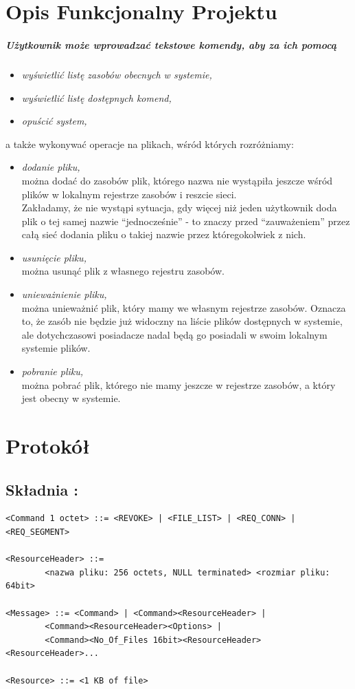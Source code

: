\documentclass[11pt,oneside]{book}
\newcommand{\+}{\discretionary{\mbox{\scriptsize$\hookleftarrow$}}{}{}}
\begin{document}
\chapter{Opis Funkcjonalny Projektu}
\paragraph{Użytkownik może wprowadzać tekstowe komendy, aby za ich pomocą}
\begin{itemize}
\item 
\textsl{wyświetlić listę zasobów obecnych w systemie,}
\item
\textsl{wyświetlić listę dostępnych komend,}
\item
\textsl{opuścić system,}
\end{itemize}
a także wykonywać operacje na plikach, wśród których rozróżniamy:
\begin{itemize}
\item
\textsl{dodanie pliku,}\\
można dodać do zasobów plik, którego nazwa nie wystąpiła jeszcze wśród plików w lokalnym rejestrze zasobów i reszcie sieci.\\
Zakładamy, że nie wystąpi sytuacja, gdy więcej niż jeden użytkownik doda plik o tej samej nazwie “jednocześnie” - to znaczy przed “zauważeniem” przez całą sieć dodania pliku o takiej nazwie przez któregokolwiek z nich.
\item
\textsl{usunięcie pliku,}\\
można usunąć plik z własnego rejestru zasobów.
\item
\textsl{unieważnienie pliku,}\\
można unieważnić plik, który mamy we własnym rejestrze zasobów. Oznacza to, że zasób nie będzie już widoczny na liście plików dostępnych w systemie, ale dotychczasowi posiadacze nadal będą go posiadali w swoim lokalnym systemie plików.
\item
\textsl{pobranie pliku,}\\
można pobrać plik, którego nie mamy jeszcze w rejestrze zasobów, a który jest obecny w systemie.
\end{itemize}
\chapter{Protokół}
\section{Składnia :}
\begin{verbatim}
<Command 1 octet> ::= <REVOKE> | <FILE_LIST> | <REQ_CONN> | <REQ_SEGMENT> 

<ResourceHeader> ::= 
        <nazwa pliku: 256 octets, NULL terminated> <rozmiar pliku: 64bit>

<Message> ::= <Command> | <Command><ResourceHeader> | 
        <Command><ResourceHeader><Options> | 
        <Command><No_Of_Files 16bit><ResourceHeader><ResourceHeader>...

<Resource> ::= <1 KB of file>
\end{verbatim}
\end{document}
